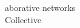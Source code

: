 \documentclass[a4paper]{article}
\begin{document}
\begin{multicols*}{2}
\begin{footnotesize}
aborative networks \\ Collective 
\end{footnotesize}
\end{multicols*}
\end{document}
